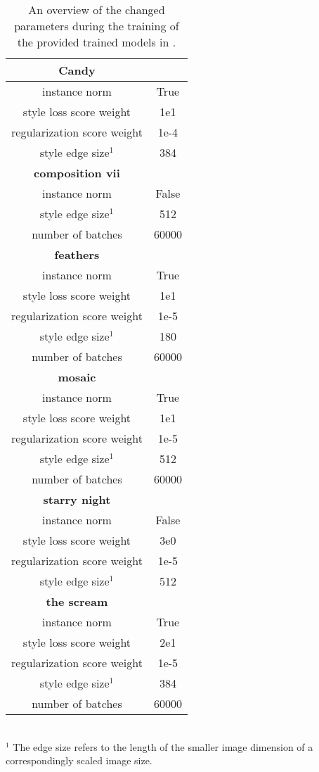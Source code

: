 \begin{table*}[!t]
	\renewcommand{\arraystretch}{1.3}
	\caption{An overview of the changed parameters during the training of the provided trained models in \cite{JAL2016}.}
	\label{tab:johnson_adapted_hyperparams}
	\centering
	\begin{tabular}{c|c}
		\hline
		\bfseries Candy &  \\
		\hline\hline
		instance norm & True \\
		style loss score weight & 1e1 \\
		regularization score weight & 1e-4\\
		style edge size$^1$ & 384\\
		\hline
		\bfseries composition vii & \\
		\hline
		instance norm & False \\
		style edge size$^1$ & 512\\
		number of batches & 60000\\
		\hline
		\bfseries feathers & \\
		\hline
		instance norm & True \\
		style loss score weight & 1e1 \\
		regularization score weight & 1e-5\\
		style edge size$^1$ & 180\\
		number of batches & 60000\\
		\hline
		\bfseries mosaic & \\
		\hline
		instance norm & True \\
		style loss score weight & 1e1 \\
		regularization score weight & 1e-5\\
		style edge size$^1$ & 512\\
		number of batches & 60000\\
		\hline
		\bfseries starry night & \\
		\hline
		instance norm & False \\
		style loss score weight & 3e0 \\
		regularization score weight & 1e-5\\
		style edge size$^1$ & 512\\
		\hline
		\bfseries the scream & \\
		\hline
		instance norm & True \\
		style loss score weight & 2e1 \\
		regularization score weight & 1e-5\\
		style edge size$^1$ & 384\\
		number of batches & 60000\\
		\hline
	\end{tabular}
	\footnotesize{
		\\$^1$ The edge size refers to the length of the smaller image dimension of a correspondingly scaled image size.}
\end{table*}
\clearpage

